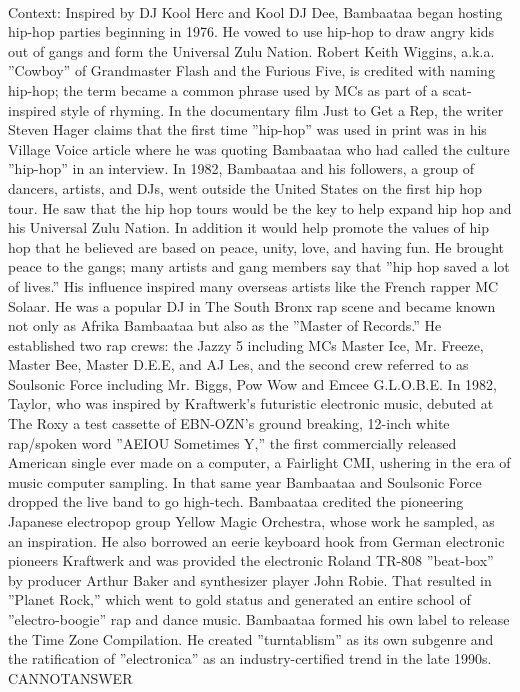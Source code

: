 \documentclass[11pt,a4paper, onecolumn]{article}
\begin{document}
\\ Context: Inspired by DJ Kool Herc and Kool DJ Dee, Bambaataa began hosting hip-hop parties beginning in 1976. He vowed to use hip-hop to draw angry kids out of gangs and form the Universal Zulu Nation. Robert Keith Wiggins, a.k.a. ''Cowboy'' of Grandmaster Flash and the Furious Five, is credited with naming hip-hop; the term became a common phrase used by MCs as part of a scat-inspired style of rhyming. In the documentary film Just to Get a Rep, the writer Steven Hager claims that the first time ''hip-hop'' was used in print was in his Village Voice article where he was quoting Bambaataa who had called the culture ''hip-hop'' in an interview. In 1982, Bambaataa and his followers, a group of dancers, artists, and DJs, went outside the United States on the first hip hop tour. He saw that the hip hop tours would be the key to help expand hip hop and his Universal Zulu Nation. In addition it would help promote the values of hip hop that he believed are based on peace, unity, love, and having fun. He brought peace to the gangs; many artists and gang members say that ''hip hop saved a lot of lives.'' His influence inspired many overseas artists like the French rapper MC Solaar. He was a popular DJ in The South Bronx rap scene and became known not only as Afrika Bambaataa but also as the ''Master of Records.'' He established two rap crews: the Jazzy 5 including MCs Master Ice, Mr. Freeze, Master Bee, Master D.E.E, and AJ Les, and the second crew referred to as Soulsonic Force including Mr. Biggs, Pow Wow and Emcee G.L.O.B.E. In 1982, Taylor, who was inspired by Kraftwerk's futuristic electronic music, debuted at The Roxy a test cassette of EBN-OZN's ground breaking, 12-inch white rap/spoken word ''AEIOU Sometimes Y,'' the first commercially released American single ever made on a computer, a Fairlight CMI, ushering in the era of music computer sampling. In that same year Bambaataa and Soulsonic Force dropped the live band to go high-tech. Bambaataa credited the pioneering Japanese electropop group Yellow Magic Orchestra, whose work he sampled, as an inspiration. He also borrowed an eerie keyboard hook from German electronic pioneers Kraftwerk and was provided the electronic Roland TR-808 ''beat-box'' by producer Arthur Baker and synthesizer player John Robie. That resulted in ''Planet Rock,'' which went to gold status and generated an entire school of ''electro-boogie'' rap and dance music. Bambaataa formed his own label to release the Time Zone Compilation. He created ''turntablism'' as its own subgenre and the ratification of ''electronica'' as an industry-certified trend in the late 1990s. CANNOTANSWER
\end{document}
